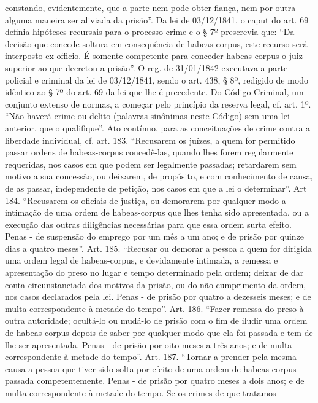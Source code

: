 {  constando, evidentemente, que a parte nem pode obter fiança, nem por
  outra alguma maneira ser aliviada da prisão''. Da lei de 03/12/1841, o
  caput do art. 69 definia hipóteses recursais para o processo crime e o
  § 7º prescrevia que: ``Da decisão que concede soltura em consequência
  de habeas-corpus, este recurso será interposto ex-officio. É somente
  competente para conceder habeas-corpus o juiz superior ao que decretou
  a prisão''. O reg. de 31/01/1842 executava a parte policial e criminal
  da lei de 03/12/1841, sendo o art. 438, § 8º, redigido de modo
  idêntico ao § 7º do art. 69 da lei que lhe é precedente. Do Código
  Criminal, um conjunto extenso de normas, a começar pelo princípio da
  reserva legal, cf. art. 1º. ``Não haverá crime ou delito (palavras
  sinônimas neste Código) sem uma lei anterior, que o qualifique''. Ato
  contínuo, para as conceituações de crime contra a liberdade
  individual, cf. art. 183. ``Recusarem os juízes, a quem for permitido
  passar ordens de habeas-corpus concedê-las, quando lhes forem
  regularmente requeridas, nos casos em que podem ser legalmente
  passadas; retardarem sem motivo a sua concessão, ou deixarem, de
  propósito, e com conhecimento de causa, de as passar, independente de
  petição, nos casos em que a lei o determinar''. Art 184. ``Recusarem
  os oficiais de justiça, ou demorarem por qualquer modo a intimação de
  uma ordem de habeas-corpus que lhes tenha sido apresentada, ou a
  execução das outras diligências necessárias para que essa ordem surta
  efeito. Penas - de suspensão do emprego por um mês a um ano; e de
  prisão por quinze dias a quatro meses''. Art. 185. ``Recusar ou
  demorar a pessoa a quem for dirigida uma ordem legal de habeas-corpus,
  e devidamente intimada, a remessa e apresentação do preso no lugar e
  tempo determinado pela ordem; deixar de dar conta circunstanciada dos
  motivos da prisão, ou do não cumprimento da ordem, nos casos
  declarados pela lei. Penas - de prisão por quatro a dezesseis meses; e
  de multa correspondente à metade do tempo''. Art. 186. ``Fazer remessa
  do preso à outra autoridade; ocultá-lo ou mudá-lo de prisão com o fim
  de iludir uma ordem de habeas-corpus depois de saber por qualquer modo
  que ela foi passada e tem de lhe ser apresentada. Penas - de prisão
  por oito meses a três anos; e de multa correspondente à metade do
  tempo''. Art. 187. ``Tornar a prender pela mesma causa a pessoa que
  tiver sido solta por efeito de uma ordem de habeas-corpus passada
  competentemente. Penas - de prisão por quatro meses a dois anos; e de
  multa correspondente à metade do tempo. Se os crimes de que tratamos
}
